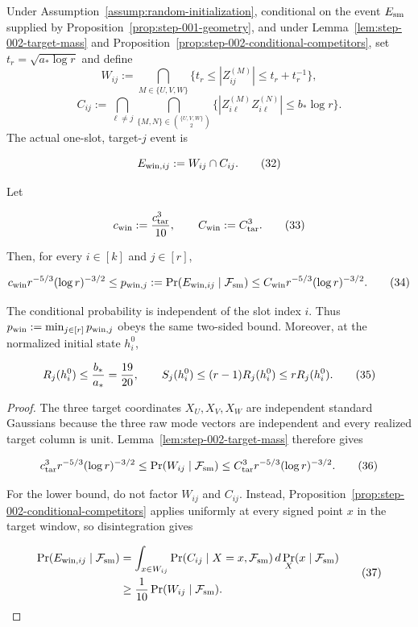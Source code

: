 \begin{proposition}\label{prop:step-002-joint-window}
Under Assumption~\ref{assump:random-initialization}, conditional on the
event $E_{\rm sm}$ supplied by Proposition~\ref{prop:step-001-geometry},
and under Lemma~\ref{lem:step-002-target-mass} and
Proposition~\ref{prop:step-002-conditional-competitors}, set
$t_r=\sqrt{a_*\log r}$ and define
\[
W_{ij}:=\bigcap_{M\in\{U,V,W\}}
\{t_r\le|Z_{ij}^{(M)}|\le t_r+t_r^{-1}\},
\]
\[
C_{ij}:=\bigcap_{\ell\ne j}
\bigcap_{\{M,N\}\in\binom{\{U,V,W\}}2}
\{|Z_{i\ell}^{(M)}Z_{i\ell}^{(N)}|\le b_*\log r\}.
\]
The actual one-slot, target-$j$ event is

\[
E_{{\rm win},ij}:=W_{ij}\cap C_{ij}.
\tag{32}
\]

Let

\[
c_{\rm win}:={c_{\rm tar}^3\over10},
\qquad C_{\rm win}:=C_{\rm tar}^3.
\tag{33}
\]

Then, for every $i\in[k]$ and $j\in[r]$,

\[
c_{\rm win}r^{-5/3}(\log r)^{-3/2}
\le p_{{\rm win},j}
:=\Pr(E_{{\rm win},ij}\mid\mathcal F_{\rm sm})
\le C_{\rm win}r^{-5/3}(\log r)^{-3/2}.
\tag{34}
\]

The conditional probability is independent of the slot index $i$. Thus
$p_{\rm win}:=\min_{j\in[r]}p_{{\rm win},j}$ obeys the same two-sided
bound. Moreover, at the normalized initial state $h_i^0$,

\[
R_j(h_i^0)\le {b_*\over a_*}={19\over20},
\qquad S_j(h_i^0)\le(r-1)R_j(h_i^0)\le rR_j(h_i^0).
\tag{35}
\]

\begin{proof}
The three target coordinates $X_U,X_V,X_W$ are independent standard
Gaussians because the three raw mode vectors are independent and every
realized target column is unit. Lemma~\ref{lem:step-002-target-mass}
therefore gives

\[
c_{\rm tar}^3r^{-5/3}(\log r)^{-3/2}
\le\Pr(W_{ij}\mid\mathcal F_{\rm sm})
\le C_{\rm tar}^3r^{-5/3}(\log r)^{-3/2}.
\tag{36}
\]

For the lower bound, do not factor $W_{ij}$ and $C_{ij}$. Instead,
Proposition~\ref{prop:step-002-conditional-competitors} applies uniformly
at every signed point $x$ in the target window, so disintegration gives

\[
\begin{aligned}
\Pr(E_{{\rm win},ij}\mid\mathcal F_{\rm sm})
&=\int_{x\in W_{ij}}
 \Pr(C_{ij}\mid X=x,\mathcal F_{\rm sm})\,
 d\Pr_X(x\mid\mathcal F_{\rm sm})\\
&\ge {1\over10}\Pr(W_{ij}\mid\mathcal F_{\rm sm}).
\end{aligned}
\tag{37}
\]


\end{proof}
\end{proposition}
